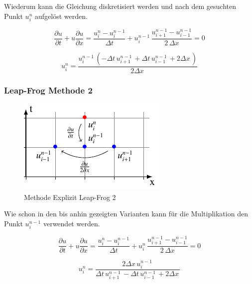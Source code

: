 	Wiederum kann die Gleichung diskretisiert werden und nach dem gesuchten Punkt $u_{i}^{n}$ aufgel\"ost werden.
	
	\begin{equation}
		\frac {\partial u}{\partial t}+u{\frac {\partial u}{\partial x}} = \frac{u_{i}^{n}-u_{i}^{n-1}}{\Delta t}+ u_{i}^{n-1}\, \frac{u_{i+1}^{n-1}-u_{i-1}^{n-1}}{2\,\Delta x}=0
		\label{burgers:eq_ex_lf1}
	\end{equation}

	\begin{equation}
	 u_{i}^{n} = \frac{u^{n-1}_{i}\, \left(- \Delta{t}\, u^{n-1}_{i+1}\, + \Delta{t}\, u^{n-1}_{i-1}\, + 2 \Delta{x}\,\right)}{2 \Delta{x}\,}
		\label{burgers:eq_ex_sol_lf1}
	\end{equation}

\subsubsection{Leap-Frog Methode 2}
     \begin{figure}[!ht]
	\centering
	\includegraphics[height=.4\textwidth]{papers/burgers/BurgersEquation/tikz/Linear4/Linear4.pdf}
	\caption{Methode Explizit  Leap-Frog 2}
	\label{burgers:fig:Linear4}
	\end{figure}

	Wie schon in den bis anhin gezeigten Varianten kann f\"ur die Multiplikation den Punkt $u_{i}^{n-1}$ verwendet werden.

	\begin{equation}
	\frac {\partial u}{\partial t}+u{\frac {\partial u}{\partial x}} = \frac{u_{i}^{n}-u_{i}^{n-1}}{\Delta t}+ u_{i}^{n}\, \frac{u_{i+1}^{n-1}-u_{i-1}^{n-1}}{2\,\Delta x}=0
	\end{equation}
	
	\begin{equation}
	u_{i}^{n} = \frac{2 \Delta{x}\, u^{n-1}_{i}\,}{\Delta{t}\, u^{n-1}_{i+1}\, - \Delta{t}\, u^{n-1}_{i-1}\, + 2 \Delta{x}\,}
	\end{equation}


